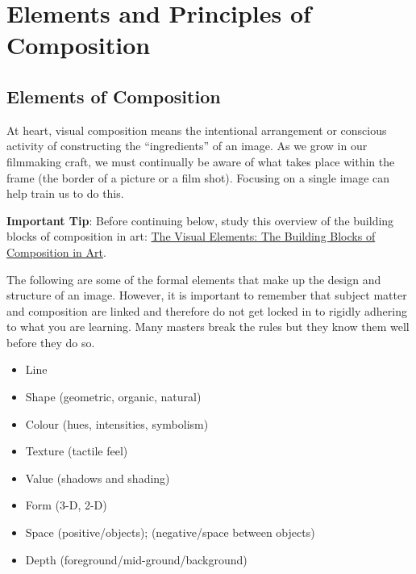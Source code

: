 \documentclass[
]{book}
\providecommand{\tightlist}{%
  \setlength{\itemsep}{0pt}\setlength{\parskip}{0pt}}
\begin{document}
\hypertarget{elements-and-principles-of-composition}{%
\section{Elements and Principles of Composition}\label{elements-and-principles-of-composition}}

\hypertarget{elements-of-composition}{%
\subsection*{Elements of Composition}\label{elements-of-composition}}

At heart, visual composition means the intentional arrangement or conscious activity of constructing the ``ingredients'' of an image. As we grow in our filmmaking craft, we must continually be aware of what takes place within the frame (the border of a picture or a film shot). Focusing on a single image can help train us to do this.

\begin{caution}
\textbf{Important Tip}: Before continuing below, study this overview of the building blocks of composition in art: \href{http://www.artyfactory.com/art_appreciation/visual-elements/visual-elements.html}{The Visual Elements: The Building Blocks of Composition in Art}.
\end{caution}

The following are some of the formal elements that make up the design and structure of an image. However, it is important to remember that subject matter and composition are linked and therefore do not get locked in to rigidly adhering to what you are learning. Many masters break the rules but they know them well before they do so.

\begin{itemize}
\tightlist
\item
  Line\\
\item
  Shape (geometric, organic, natural)\\
\item
  Colour (hues, intensities, symbolism)\\
\item
  Texture (tactile feel)\\
\item
  Value (shadows and shading)\\
\item
  Form (3-D, 2-D)\\
\item
  Space (positive/objects); (negative/space between objects)\\
\item
  Depth (foreground/mid-ground/background)
\end{itemize}
\end{document}
